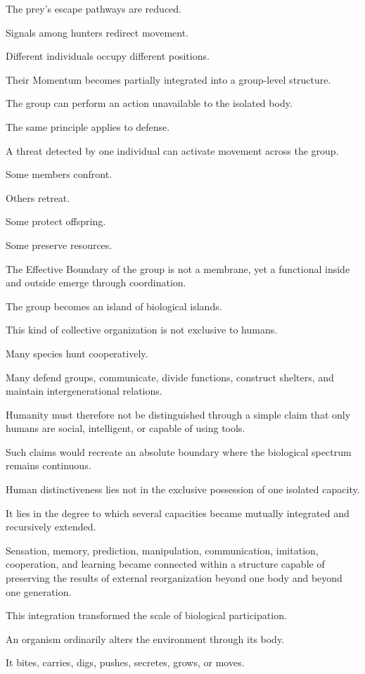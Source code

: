 The prey’s escape pathways are reduced.

Signals among hunters redirect movement.

Different individuals occupy different positions.

Their Momentum becomes partially integrated into a group-level structure.

The group can perform an action unavailable to the isolated body.

The same principle applies to defense.

A threat detected by one individual can activate movement across the group.

Some members confront.

Others retreat.

Some protect offspring.

Some preserve resources.

The Effective Boundary of the group is not a membrane, yet a functional inside and outside emerge through coordination.

The group becomes an island of biological islands.

This kind of collective organization is not exclusive to humans.

Many species hunt cooperatively.

Many defend groups, communicate, divide functions, construct shelters, and maintain intergenerational relations.

Humanity must therefore not be distinguished through a simple claim that only humans are social, intelligent, or capable of using tools.

Such claims would recreate an absolute boundary where the biological spectrum remains continuous.

Human distinctiveness lies not in the exclusive possession of one isolated capacity.

It lies in the degree to which several capacities became mutually integrated and recursively extended.

Sensation, memory, prediction, manipulation, communication, imitation, cooperation, and learning became connected within a structure capable of preserving the results of external reorganization beyond one body and beyond one generation.

This integration transformed the scale of biological participation.

An organism ordinarily alters the environment through its body.

It bites, carries, digs, pushes, secretes, grows, or moves.

